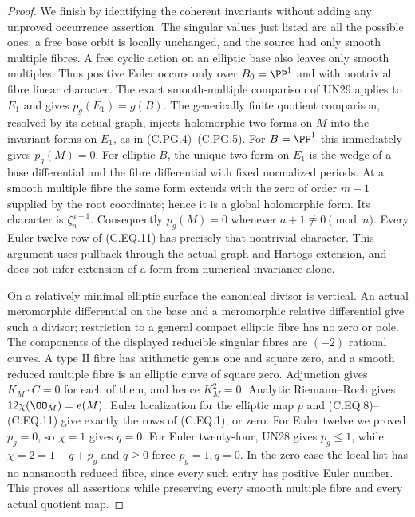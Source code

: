 \begin{proof}
We finish by identifying the coherent invariants
without adding any unproved occurrence assertion.
The singular values just listed are all the possible
ones: a free base orbit is locally unchanged, and
the source had only smooth multiple fibres.
A free cyclic action on an elliptic base also leaves
only smooth multiples. Thus positive Euler occurs
only over $B_0=\PP^1$ and with nontrivial fibre
linear character. The exact smooth-multiple comparison
of UN29 applies to $E_1$ and gives $p_g(E_1)=g(B)$.
The generically finite quotient comparison, resolved
by its actual graph, injects holomorphic two-forms
on $M$ into the invariant forms on $E_1$, as in
(C.PG.4)--(C.PG.5).
For $B=\PP^1$ this immediately gives $p_g(M)=0$.
For elliptic $B$, the unique two-form on $E_1$ is
the wedge of a base differential and the fibre
differential with fixed normalized periods. At a
smooth multiple fibre the same form extends with
the zero of order $m-1$ supplied by the root
coordinate; hence it is a global holomorphic form.
Its character is $\zeta_n^{a+1}$. Consequently
$p_g(M)=0$ whenever $a+1\not\equiv0\pmod n$.
Every Euler-twelve row of (C.EQ.11) has precisely
that nontrivial character. This argument uses
pullback through the actual graph and Hartogs
extension, and does not infer extension of a
form from numerical invariance alone.

On a relatively minimal elliptic surface the canonical
divisor is vertical. An actual meromorphic differential
on the base and a meromorphic relative differential
give such a divisor; restriction to a general compact
elliptic fibre has no zero or pole. The components
of the displayed reducible singular fibres are $(-2)$
rational curves. A type $\mathrm{II}$ fibre has arithmetic
genus one and square zero, and a smooth reduced multiple
fibre is an elliptic curve of square zero. Adjunction gives
$K_M\cdot C=0$ for each of them, and hence $K_M^2=0$.
Analytic Riemann--Roch gives
$12\chi(\OO_M)=e(M)$. Euler localization for the
elliptic map $p$ and (C.EQ.8)--(C.EQ.11) give
exactly the rows of (C.EQ.1), or zero. For Euler
twelve we proved $p_g=0$, so $\chi=1$ gives $q=0$.
For Euler twenty-four, UN28 gives $p_g\le1$, while
$\chi=2=1-q+p_g$ and $q\ge0$ force $p_g=1,q=0$.
In the zero case
the local list has no nonsmooth reduced fibre,
since every such entry has positive Euler number.
This proves all assertions while preserving every
smooth multiple fibre and every actual quotient map.
\end{proof}
